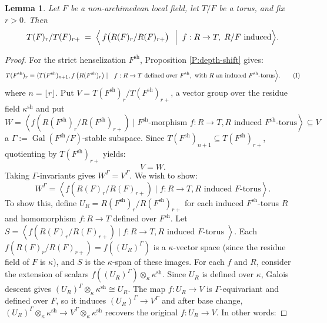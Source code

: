 \documentclass[american]{article}
\numberwithin{equation}{section}
\numberwithin{figure}{section}
\theoremstyle{plain}
\newtheorem{lemma}[theorem]{Lemma}
\theoremstyle{definition}
\theoremstyle{remark}
\DeclareMathOperator{\Gal}{Gal}
\DeclareMathOperator{\sh}{sh}
\begin{document}
\begin{lemma}
\label{lem:gen-by-induced}
Let \(F\) be a non-archimedean local field, let \(T/F\) be a torus, and fix \(r>0\).
Then
\[
   T(F)_r / T(F)_{r+}
   \;=\;
   \Bigl\langle\,
      f\bigl(R(F)_r/R(F)_{r+}\bigr)\,
      \;\Bigm|\;
      f:R\rightarrow T,\;
      R/F\text{ induced}
   \Bigr\rangle .
\]
\end{lemma}
\begin{proof}
For the strict henselization \(F^{\text{sh}}\), Proposition \ref{P:depth-shift} gives:
   \[
   T(F^{\text{sh}})_r = \langle T(F^{\text{sh}})_{n+1},  f\left(R(F^{\text{sh}})_r\right) \mid \ \ f:R\to T \text{ defined over } F^{\mathrm{sh}}, \text{ with } R \text{ an induced } F^{\mathrm{sh}}\text{-torus}\Big{\rangle}. \tag{I}
   \]
where \(n = \lfloor r \rfloor\). Put \(V = T(F^{\text{sh}})_r / T(F^{\text{sh}})_{r+}\), a vector group over the residue field \(\kappa^{\text{sh}}\) and put 
   \[
   W = \left\langle f\left(R(F^{\text{sh}})_r / R(F^{\text{sh}})_{r+}\right) \mid F^{\sh}\text{-morphism } f: R \to T,  R \text{ induced }F^{\sh}\text{-torus} \right\rangle \subseteq V
   \]
 a \(\Gamma:=\Gal(F^{\sh}/F)\)-stable subspace. Since \(T(F^{\text{sh}})_{n+1} \subseteq T(F^{\text{sh}})_{r+}\), quotienting by \(T(F^{\text{sh}})_{r+}\) yields:
 \[
 V=W.\tag{II}
 \]
 Taking \(\Gamma\)-invariants gives \(W^\Gamma = V^\Gamma\). We wish to show:
   \[
 W^\Gamma = \left\langle f\left(R(F)_r / R(F)_{r+}\right) \mid f: R \to T,  R \text{ induced }F \text{-torus}\right\rangle.
   \]
To show this, define \( U_R = R(F^{\text{sh}})_r / R(F^{\text{sh}})_{r+} \) for each induced $F^{\sh}$-torus \( R \) and homomorphism \( f: R \to T \) defined over \( F^{\sh} \). Let \( S = \left\langle f\left(R(F)_r / R(F)_{r+}\right) \mid f: R \to T,  R \text{ induced }F\text{-torus } \right\rangle \). Each \( f\left(R(F)_r / R(F)_{r+}\right) = f\left((U_R)^\Gamma\right) \) is a \( \kappa \)-vector space (since the residue field of \( F \) is \( \kappa \)), and \( S \) is the \( \kappa \)-span of these images. For each \( f \) and \( R \), consider the extension of scalars \( f\left((U_R)^\Gamma\right) \otimes_\kappa \kappa^{\text{sh}} \). Since \( U_R \) is defined over \( \kappa \), Galois descent gives \( (U_R)^\Gamma \otimes_\kappa \kappa^{\text{sh}} \cong U_R \).
The map \( f: U_R \to V \) is \( \Gamma \)-equivariant and defined over \( F \), so it induces \( (U_R)^\Gamma \to V^\Gamma \) and after base change, \(  (U_R)^\Gamma \otimes_\kappa \kappa^{\text{sh}} \to V^\Gamma \otimes_\kappa \kappa^{\text{sh}} \) recovers the original \( f: U_R \to V \). In other words:

\end{proof}
\end{document}
